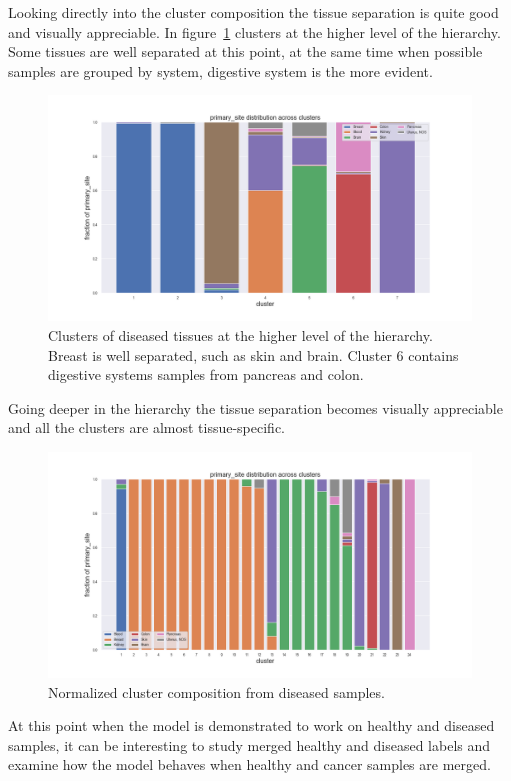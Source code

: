 Looking directly into the cluster composition the tissue separation is quite good and visually appreciable. In figure~\ref{fig:topic/tcga/fraction_clustercomposition_l4_primary_site} clusters at the higher level of the hierarchy. Some tissues are well separated at this point, at the same time when possible samples are grouped by system, digestive system is the more evident.
\begin{figure}[htb!]
	\centering
	\includegraphics[width=0.8\linewidth]{pictures/topic/tcga/fraction_clustercomposition_l4_primary_site.png}
	\caption{Clusters of diseased tissues at the higher level of the hierarchy. Breast is well separated, such as skin and brain. Cluster 6 contains digestive systems samples from pancreas and colon.}
	\label{fig:topic/tcga/fraction_clustercomposition_l4_primary_site}
\end{figure}
Going deeper in the hierarchy the tissue separation becomes visually appreciable and all the clusters are almost tissue-specific.
\begin{figure}[htb!]
	\centering
	\includegraphics[width=0.8\linewidth]{pictures/topic/tcga/fraction_clustercomposition_l3_primary_site.png}
	\caption{Normalized cluster composition from diseased samples.}
	\label{fig:topic/tcga/fraction_clustercomposition_l3_primary_site}
\end{figure}
\FloatBarrier
At this point when the model is demonstrated to work on healthy and diseased samples, it can be interesting to study merged healthy and diseased labels and examine how the model behaves when healthy and cancer samples are merged.